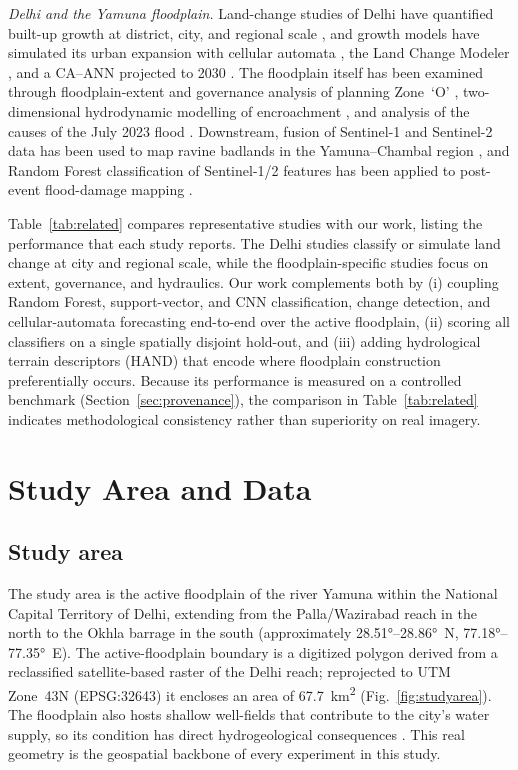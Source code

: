 \documentclass[journal]{IEEEtran}
\begin{document}
\emph{Delhi and the Yamuna floodplain.} Land-change studies of Delhi have quantified built-up growth at district, city, and regional scale \cite{rahman2012urban,tripathy2019monitoring,naikoo2020land,singh2022land}, and growth models have simulated its urban expansion with cellular automata \cite{tripathy2019monitoring}, the Land Change Modeler \cite{singh2022land}, and a CA--ANN projected to 2030 \cite{jain2024future}. The floodplain itself has been examined through floodplain-extent and governance analysis of planning Zone~`O' \cite{bhadu2023governance}, two-dimensional hydrodynamic modelling of encroachment \cite{anand2024hydrodynamic}, and analysis of the causes of the July 2023 flood \cite{singh2025unveiling}. Downstream, fusion of Sentinel-1 and Sentinel-2 data has been used to map ravine badlands in the Yamuna--Chambal region \cite{khan2020sentinel}, and Random Forest classification of Sentinel-1/2 features has been applied to post-event flood-damage mapping \cite{tavus2022flood}.

Table~\ref{tab:related} compares representative studies with our work, listing the performance that each study reports. The Delhi studies classify or simulate land change at city and regional scale, while the floodplain-specific studies focus on extent, governance, and hydraulics. Our work complements both by (i) coupling Random Forest, support-vector, and CNN classification, change detection, and cellular-automata forecasting end-to-end over the active floodplain, (ii) scoring all classifiers on a single spatially disjoint hold-out, and (iii) adding hydrological terrain descriptors (HAND) that encode where floodplain construction preferentially occurs. Because its performance is measured on a controlled benchmark (Section~\ref{sec:provenance}), the comparison in Table~\ref{tab:related} indicates methodological consistency rather than superiority on real imagery.


\section{Study Area and Data}\label{sec:data}

\subsection{Study area}
The study area is the active floodplain of the river Yamuna within the National Capital Territory of Delhi, extending from the Palla/Wazirabad reach in the north to the Okhla barrage in the south (approximately \ang{28.51}--\ang{28.86}~N, \ang{77.18}--\ang{77.35}~E). The active-floodplain boundary is a digitized polygon derived from a reclassified satellite-based raster of the Delhi reach; reprojected to UTM Zone~43N (EPSG:32643) it encloses an area of 67.7~km\textsuperscript{2} (Fig.~\ref{fig:studyarea}). The floodplain also hosts shallow well-fields that contribute to the city's water supply, so its condition has direct hydrogeological consequences \cite{shekhar2009delhi,rao2007delhi}. This real geometry is the geospatial backbone of every experiment in this study.
\end{document}
